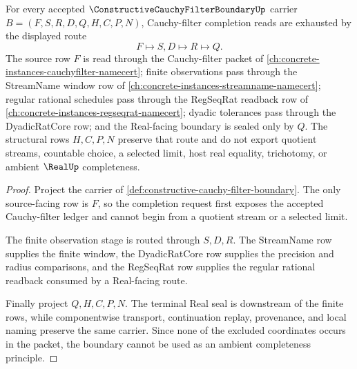 \begin{theorem}\label{thm:constructive-cauchy-filter-boundary-namecert-obligations}
For every accepted $\ConstructiveCauchyFilterBoundaryUp$ carrier $B=(F,S,R,D,Q,H,C,P,N)$, Cauchy-filter completion reads are exhausted by the displayed route
$$
F \longmapsto S,D \longmapsto R \longmapsto Q .
$$
The source row $F$ is read through the Cauchy-filter packet of \autoref{ch:concrete-instances-cauchyfilter-namecert}; finite observations pass through the StreamName window row of \autoref{ch:concrete-instances-streamname-namecert}; regular rational schedules pass through the RegSeqRat readback row of \autoref{ch:concrete-instances-regseqrat-namecert}; dyadic tolerances pass through the DyadicRatCore row; and the Real-facing boundary is sealed only by $Q$. The structural rows $H,C,P,N$ preserve that route and do not export quotient streams, countable choice, a selected limit, host real equality, trichotomy, or ambient $\RealUp$ completeness.
\end{theorem}
\begin{proof}
Project the carrier of \autoref{def:constructive-cauchy-filter-boundary}. The only source-facing row is $F$, so the completion request first exposes the accepted Cauchy-filter ledger and cannot begin from a quotient stream or a selected limit.

The finite observation stage is routed through $S,D,R$. The StreamName row supplies the finite window, the DyadicRatCore row supplies the precision and radius comparisons, and the RegSeqRat row supplies the regular rational readback consumed by a Real-facing route.

Finally project $Q,H,C,P,N$. The terminal Real seal is downstream of the finite rows, while componentwise transport, continuation replay, provenance, and local naming preserve the same carrier. Since none of the excluded coordinates occurs in the packet, the boundary cannot be used as an ambient completeness principle.
\end{proof}


